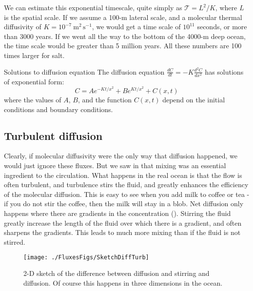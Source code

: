 We can estimate this exponential timescale, quite simply as $\mathcal{T} = L^2/K$, where $L$ is the spatial scale.  If we assume a 100-m lateral scale, and a molecular thermal diffusivity of $K=10^{-7}\ \mathrm{m^2\,s^{-1}}$, we would get a time scale of $10^{11}$ seconds, or more than 3000 years.  If we went all the way to the bottom of the 4000-m deep ocean, the time scale would be greater than 5 million years.  All these numbers are 100 times larger for salt.  

\begin{derivbox}[label={box:exponentials}]{Solutions to diffusion equation}
The diffusion equation $\frac{dC}{dt} = -K \frac{d^2 C}{dx^2}$ has solutions of exponential form:
\begin{equation}
    C = A e^{-K t/x^2} + B e^{K t / x^2} + C(x,t)
\end{equation}
where the values of $A$, $B$, and the function $C(x,t)$ depend on the initial conditions and boundary conditions. 
\end{derivbox}

\subsection{Turbulent diffusion}

Clearly, if molecular diffusivity were the only way that diffusion happened, we would just ignore these fluxes.  But we saw in  that mixing was an essential ingredient to the circulation.  What happens in the real ocean is that the flow is often turbulent, and turbulence stirs the fluid, and greatly enhances the efficiency of the molecular diffusion.  This is easy to see when you add milk to coffee or tea - if you do not stir the coffee, then the milk will stay in a blob.  Net diffusion only happens where there are gradients in the concentration (). Stirring the fluid greatly increase the length of the fluid over which there is a gradient, and often sharpens the gradients. This leads to much more mixing than if the fluid is not stirred.  

\begin{figure}[hbt]
  \begin{center}
    \texttt{[image: ./FluxesFigs/SketchDiffTurb]}
    \caption{2-D sketch of the difference between diffusion and stirring and diffusion. Of course this happens in three dimensions in the ocean. }
    \label{fig:SketchDiffTurb}  
  \end{center}
\end{figure}

